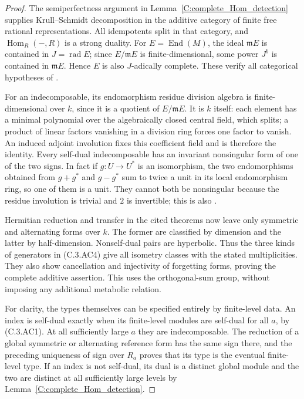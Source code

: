 \begin{proof}
The semiperfectness argument in
Lemma~\ref{C:complete_Hom_detection} supplies Krull--Schmidt
decomposition in the additive category of finite free
rational representations.  All idempotents split in that
category, and $\operatorname{Hom}_R(-,R)$ is a strong duality.
For $E=\operatorname{End}(M)$, the ideal $\mathfrak mE$ is
contained in $J=\operatorname{rad}E$; since $E/\mathfrak mE$
is finite-dimensional, some power $J^b$ is contained in
$\mathfrak mE$.  Hence $E$ is also $J$-adically complete.
These verify all categorical hypotheses of
\cite[Theorems 2.2, 3.2 and 3.3, pp.\ 269--273]{C-QSS1979}.

For an indecomposable, its endomorphism residue division
algebra is finite-dimensional over $k$, since it is a
quotient of $E/\mathfrak mE$.  It is $k$ itself: each
element has a minimal polynomial over the algebraically
closed central field, which splits; a product of linear
factors vanishing in a division ring forces one factor
to vanish.  An induced adjoint involution fixes this
coefficient field and is therefore the identity.
Every self-dual indecomposable has an invariant nonsingular
form of one of the two signs.  In fact if $g:U\to U^*$
is an isomorphism, the two endomorphisms obtained from
$g+g^*$ and $g-g^*$ sum to twice a unit in its local
endomorphism ring, so one of them is a unit.  They cannot
both be nonsingular because the residue involution is
trivial and $2$ is invertible; this is also
\cite[Proposition 2.5, p.\ 271]{C-QSS1979}.

Hermitian reduction and transfer in the cited theorems
now leave only symmetric and alternating forms over $k$.
The former are classified by dimension and the latter
by half-dimension.  Nonself-dual pairs are hyperbolic.
Thus the three kinds of generators in (C.3.AC4) give all
isometry classes with the stated multiplicities.  They
also show cancellation and injectivity of forgetting
forms, proving the complete additive assertion.  This
uses the orthogonal-sum group, without imposing any
additional metabolic relation.

For clarity, the types themselves can be specified entirely
by finite-level data.  An index is self-dual exactly when
its finite-level modules are self-dual for all $a$, by
(C.3.AC1).  At all sufficiently large $a$ they are
indecomposable.  The reduction of a global symmetric or
alternating reference form has the same sign there, and
the preceding uniqueness of sign over $R_a$ proves that
its type is the eventual finite-level type.  If an index
is not self-dual, its dual is a distinct global module and
the two are distinct at all sufficiently large levels by
Lemma~\ref{C:complete_Hom_detection}.


\end{proof}
